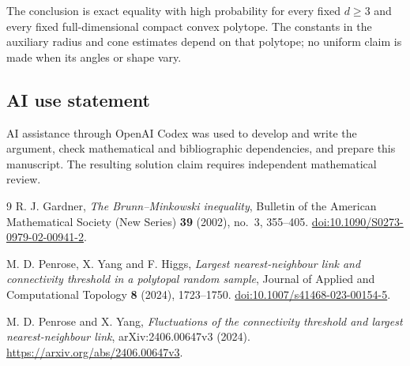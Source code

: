 \documentclass[11pt]{article}
\theoremstyle{remark}
\begin{document}
The conclusion is exact equality with high probability for every fixed
$d\geq3$ and every fixed full-dimensional compact convex polytope.
The constants in the auxiliary radius and cone estimates depend on that
polytope; no uniform claim is made when its angles or shape vary.

\subsection*{AI use statement}
AI assistance through OpenAI Codex was used to develop and write the
argument, check mathematical and bibliographic dependencies, and prepare
this manuscript. The resulting solution claim requires independent
mathematical review.

\begin{thebibliography}{9}
R. J. Gardner, \emph{The Brunn--Minkowski inequality},
Bulletin of the American Mathematical Society (New Series)
\textbf{39} (2002), no.~3, 355--405.
\href{https://doi.org/10.1090/S0273-0979-02-00941-2}{doi:10.1090/S0273-0979-02-00941-2}.

M. D. Penrose, X. Yang and F. Higgs,
\emph{Largest nearest-neighbour link and connectivity threshold in a
polytopal random sample}, Journal of Applied and Computational Topology
\textbf{8} (2024), 1723--1750.
\href{https://doi.org/10.1007/s41468-023-00154-5}{doi:10.1007/s41468-023-00154-5}.

M. D. Penrose and X. Yang,
\emph{Fluctuations of the connectivity threshold and largest
nearest-neighbour link}, arXiv:2406.00647v3 (2024).
\href{https://arxiv.org/abs/2406.00647v3}{https://arxiv.org/abs/2406.00647v3}.
\end{thebibliography}
\end{document}
